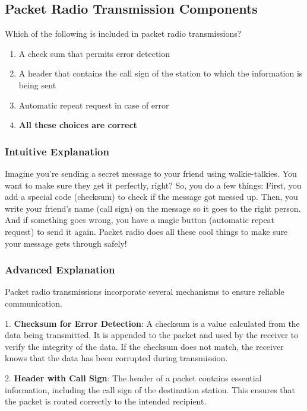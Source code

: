 \subsection{Packet Radio Transmission Components}
\label{T8D08}

\begin{tcolorbox}[colback=gray!10!white,colframe=black!75!black,title=T8D08]
Which of the following is included in packet radio transmissions?
\begin{enumerate}[label=\Alph*)]
    \item A check sum that permits error detection
    \item A header that contains the call sign of the station to which the information is being sent
    \item Automatic repeat request in case of error
    \item \textbf{All these choices are correct}
\end{enumerate}
\end{tcolorbox}

\subsubsection{Intuitive Explanation}
Imagine you're sending a secret message to your friend using walkie-talkies. You want to make sure they get it perfectly, right? So, you do a few things: First, you add a special code (checksum) to check if the message got messed up. Then, you write your friend's name (call sign) on the message so it goes to the right person. And if something goes wrong, you have a magic button (automatic repeat request) to send it again. Packet radio does all these cool things to make sure your message gets through safely!

\subsubsection{Advanced Explanation}
Packet radio transmissions incorporate several mechanisms to ensure reliable communication. 

1. \textbf{Checksum for Error Detection}: A checksum is a value calculated from the data being transmitted. It is appended to the packet and used by the receiver to verify the integrity of the data. If the checksum does not match, the receiver knows that the data has been corrupted during transmission.

2. \textbf{Header with Call Sign}: The header of a packet contains essential information, including the call sign of the destination station. This ensures that the packet is routed correctly to the intended recipient.


